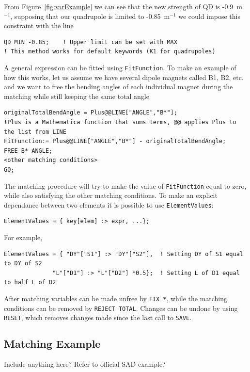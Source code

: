 \documentclass{article}
\begin{document}
From Figure~\ref{fig:varExample} we can see that the new strength of QD is -0.9~m$^{-1}$, supposing that our quadrupole is limited to -0.85~m$^{-1}$ we could impose this constraint with the line
\begin{lstlisting}
QD MIN -0.85;    ! Upper limit can be set with MAX
! This method works for default keywords (K1 for quadrupoles)
\end{lstlisting}

A general expression can be fitted using \texttt{FitFunction}. To make an example of how this works, let us assume we have several dipole magnets called B1, B2, etc. and we want to free the bending angles of each individual magnet during the matching while still keeping the same total angle 
\begin{lstlisting}
originalTotalBendAngle = Plus@@LINE["ANGLE","B*"];
!Plus is a Mathematica function that sums terms, @@ applies Plus to the list from LINE
FitFunction:= Plus@@LINE["ANGLE","B*"] - originalTotalBendAngle;
FREE B* ANGLE;
<other matching conditions>
GO;
\end{lstlisting}
The matching procedure will try to make the value of \texttt{FitFunction} equal to zero, while also satisfying the other matching conditions.
To make an explicit dependance between two elements it is possible to use \texttt{ElementValues}:
\begin{lstlisting}
ElementValues = { key[elem] :> expr, ...};
\end{lstlisting}
For example,
\begin{lstlisting}
ElementValues = { "DY"["S1"] :> "DY"["S2"],  ! Setting DY of S1 equal to DY of S2
              "L"["D1"] :> "L"["D2"] *0.5};  ! Setting L of D1 equal to half L of D2
\end{lstlisting}
After matching variables can be made unfree by \texttt{FIX *}, while the matching conditions can be removed by \texttt{REJECT TOTAL}. Changes can be undone by using \texttt{RESET}, which removes changes made since the last call to \texttt{SAVE}.

\subsection{Matching Example}
Include anything here? Refer to official SAD example?
\end{document}
